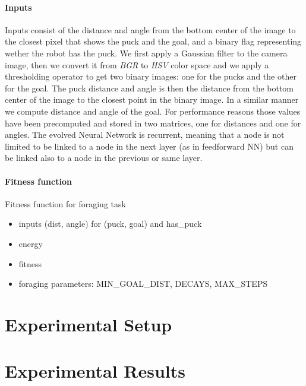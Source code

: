 \documentclass{article}
\begin{document}
	\paragraph{Inputs} %
	\label{par:foraging_inputs}
	Inputs consist of the distance and angle from the bottom center of the image
	to the closest pixel that shows the puck and the goal, and a binary flag
	representing wether the robot has the puck. We first apply a Gaussian filter
	to the camera image, then we convert it from \textit{BGR} to \textit{HSV}
	color space and we apply a thresholding operator to get two binary images:
	one for the pucks and the other for the goal. The puck distance and angle is
	then the distance from the bottom center of the image to the closest point
	in the binary image. In a similar manner we compute distance and angle of
	the goal. For performance reasons those values have been precomputed and
	stored in two matrices, one for distances and one for angles.
	The evolved Neural Network is recurrent, meaning that a node is not limited
	to be linked to a node in the next layer (as in feedforward NN) but can be
	linked also to a node in the previous or same layer.

	\paragraph{Fitness function} %
	\label{par:foraging_fitness}
	Fitness function for foraging task

	\begin{itemize}
		\item inputs (dist, angle) for (puck, goal) and has\_puck
		\item energy
		\item fitness
		\item foraging parameters: MIN\_GOAL\_DIST, DECAYS, MAX\_STEPS
	\end{itemize}


	\section{Experimental Setup} %
	\label{sec:setup}


	\section{Experimental Results} %
	\label{sec:results}
	
\end{document}
